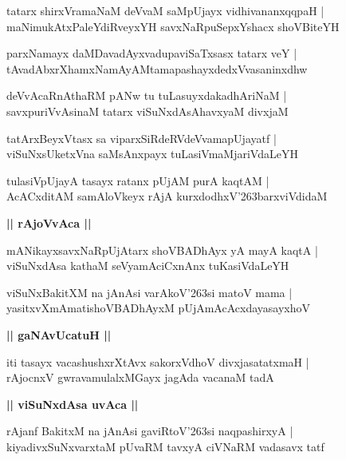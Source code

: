\documentclass[twoside,12pt,openright]{book}
\def\S{\char'263}
\newcounter{shloka}[chapter]
\def\uvaca#1{\centerline{{\large\textbf{#1}}}}
\begin{document}
\begin{shloka}%
tatarx shirxVramaNaM deVvaM saMpUjayx vidhivananxqqpaH |\\
maNimukAtxPaleYdiRveyxYH savxNaRpuSepxYshacx shoVBiteYH
\end{shloka}

\begin{shloka}%
parxNamayx daMDavadAyxvadupaviSaTxsasx tatarx veY |\\
tAvadAbxrXhamxNamAyAMtamapashayxdedxVvasaninxdhw
\end{shloka}

\begin{shloka}%
deVvAcaRnAthaRM pANw tu tuLasuyxdakadhAriNaM |\\
savxpuriVvAsinaM tatarx viSuNxdAsAhavxyaM divxjaM 
\end{shloka}

\begin{shloka}%
tatArxBeyxVtasx sa viparxSiRdeRVdeVvamapUjayatf |\\
viSuNxsUketxVna saMsAnxpayx tuLasiVmaMjariVdaLeYH
\end{shloka}

\begin{shloka}%
tulasiVpUjayA tasayx ratanx pUjAM purA kaqtAM |\\
AcACxditAM samAloVkeyx rAjA kurxdodhxV\S barxviVdidaM 
\end{shloka}

\uvaca{|| rAjoVvAca ||}

\begin{shloka}%
mANikayxsavxNaRpUjAtarx shoVBADhAyx yA mayA kaqtA |\\
viSuNxdAsa kathaM seVyamAciCxnAnx tuKasiVdaLeYH
\end{shloka}

\begin{shloka}%
viSuNxBakitXM na   jAnAsi varAkoV\S si matoV mama |\\
yasitxvXmAmatishoVBADhAyxM pUjAmAcAcxdayasayxhoV 
\end{shloka}

\uvaca{|| gaNAvUcatuH ||}

\begin{shloka}%
iti tasayx vacashushxrXtAvx sakorxVdhoV divxjasatatxmaH |\\
rAjocnxV gwravamulalxMGayx jagAda vacanaM tadA 
\end{shloka}

\uvaca{|| viSuNxdAsa uvAca ||}

\begin{shloka}%
rAjanf BakitxM na jAnAsi gaviRtoV\S si naqpashirxyA |\\
kiyadivxSuNxvarxtaM pUvaRM tavxyA ciVNaRM vadasavx tatf
\end{shloka}
\end{document}
